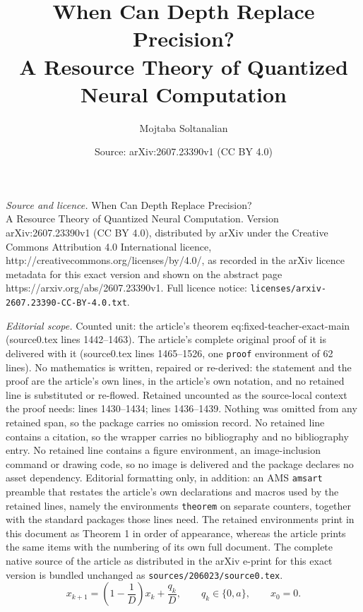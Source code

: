 \documentclass[10pt,a4paper]{amsart}
\title{When Can Depth Replace Precision?\\ A Resource Theory of Quantized Neural Computation}
\author{Mojtaba Soltanalian}
\date{Source: arXiv:2607.23390v1 (CC BY 4.0)}
\begin{document}
\maketitle

\noindent\emph{Source and licence.} When Can Depth Replace Precision?\\ A Resource Theory of Quantized Neural Computation. Version arXiv:2607.23390v1 (CC BY 4.0), distributed by arXiv under the Creative Commons Attribution 4.0 International licence, http://creativecommons.org/licenses/by/4.0/, as recorded in the arXiv licence metadata for this exact version and shown on the abstract page https://arxiv.org/abs/2607.23390v1. Full licence notice: \texttt{licenses/arxiv-2607.23390-CC-BY-4.0.txt}.\par\smallskip

\noindent\textit{Editorial scope.} Counted unit: the article's theorem eq:fixed-teacher-exact-main (source0.tex lines 1442--1463). The article's complete original proof of it is delivered with it (source0.tex lines 1465--1526, one \texttt{proof} environment of 62 lines). No mathematics is written, repaired or re-derived: the statement and the proof are the article's own lines, in the article's own notation, and no retained line is substituted or re-flowed.  Retained uncounted as the source-local context the proof needs: lines 1430--1434; lines 1436--1439.  Nothing was omitted from any retained span, so the package carries no omission record.  No retained line contains a citation, so the wrapper carries no bibliography and no bibliography entry.  No retained line contains a figure environment, an image-inclusion command or drawing code, so no image is delivered and the package declares no asset dependency.  Editorial formatting only, in addition: an AMS \texttt{amsart} preamble that restates the article's own declarations and macros used by the retained lines, namely the environments \texttt{theorem} on separate counters, together with the standard packages those lines need.  The retained environments print in this document as Theorem 1 in order of appearance, whereas the article prints the same items with the numbering of its own full document.  The complete native source of the article as distributed in the arXiv e-print for this exact version is bundled unchanged as \texttt{sources/206023/source0.tex}.
\begin{equation}
 x_{k+1}=\left(1-\frac1D\right)x_k+\frac{q_k}{D},
 \qquad q_k\in\{0,a\},\qquad x_0=0.
 \label{eq:binary-recursion-main}
\end{equation}
\end{document}
